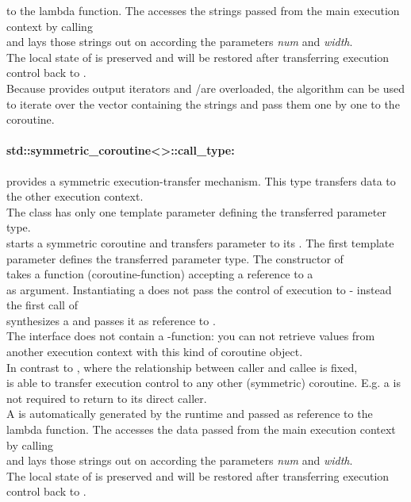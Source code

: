 to the lambda function. The \corofunction accesses the strings passed
from the main execution context by calling\\
\pullcoroget and lays those
strings out on  according the parameters \textit{num} and \textit{width}.\\
The local state of \corofunction is preserved and will be restored after
transferring execution control back to \corofunction.\\
Because \pushcoro provides output iterators and \bgin/\ed are overloaded, the
 algorithm can be used to iterate over the vector containing the
strings and pass them one by one to the coroutine.

\paragraph*{std::symmetric\_coroutine<>::call\_type:}
provides a symmetric execution-transfer mechanism. This type transfers data to
the other execution context.\\
The class has only one template parameter defining the transferred parameter
type.\\
\newline
\callcoro starts a symmetric coroutine and transfers parameter to its
\corofunction. The first template parameter defines the transferred parameter
type. The constructor of\\
\callcoro takes a function (coroutine-function) accepting a reference to a\\
\yieldcoro as argument. Instantiating a \callcoro does not pass the control of
execution to \corofunction - instead the first call of\\
\callcoroop synthesizes a \yieldcoro and passes it as reference to \corofunction.\\
The \callcoro interface does not contain a \get-function: you can not retrieve
values from another execution context with this kind of coroutine object.\\
\newline
In contrast to \acoro, where the relationship between caller and callee is
fixed,\\
\scoro is able to transfer execution control to any other (symmetric) coroutine.
E.g. a \scoro is not required to return to its direct caller.\\
\newline
A \yieldcoro is automatically generated by the runtime and passed as reference
to the lambda function. The \corofunction accesses the data passed from the
main execution context by calling\\
\yieldcoroget and lays those strings out on  according the
parameters \textit{num} and \textit{width}.\\
The local state of \corofunction is preserved and will be restored after
transferring execution control back to \corofunction.\\

